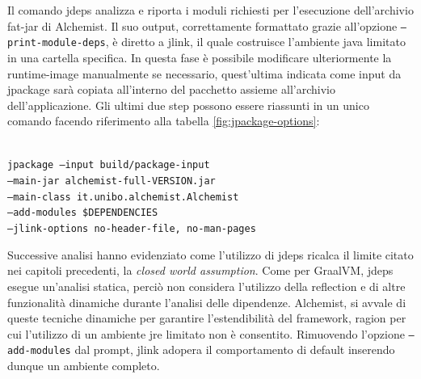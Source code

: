 Il comando jdeps analizza e riporta i moduli richiesti per l'esecuzione dell'archivio fat-jar di Alchemist. Il suo output, correttamente formattato grazie all'opzione \texttt{--print-module-deps}, è diretto a jlink, il quale costruisce l'ambiente java limitato in una cartella specifica. In questa fase è possibile modificare ulteriormente la runtime-image manualmente se necessario, quest'ultima indicata come input da jpackage sarà copiata all'interno del pacchetto assieme all'archivio dell'applicazione. Gli ultimi due step possono essere riassunti in un unico comando facendo riferimento alla tabella \ref{fig:jpackage-options}:

\texttt{\\ jpackage --input build/package-input \\ \tab\tab --main-jar alchemist-full-VERSION.jar \\ \tab\tab --main-class it.unibo.alchemist.Alchemist \\ \tab\tab --add-modules \$DEPENDENCIES \\ \tab\tab --jlink-options no-header-file, no-man-pages \\}

Successive analisi hanno evidenziato come l'utilizzo di jdeps ricalca il limite citato nei capitoli precedenti, la \textit{closed world assumption}. Come per GraalVM, jdeps esegue un'analisi statica, perciò non considera l'utilizzo della reflection e di altre funzionalità dinamiche durante l'analisi delle dipendenze. Alchemist, si avvale di queste tecniche dinamiche per garantire l'estendibilità del framework, ragion per cui l'utilizzo di un ambiente \ac{jre} limitato non è consentito. Rimuovendo l'opzione \texttt{--add-modules} dal prompt, jlink adopera il comportamento di default inserendo dunque un ambiente completo.

